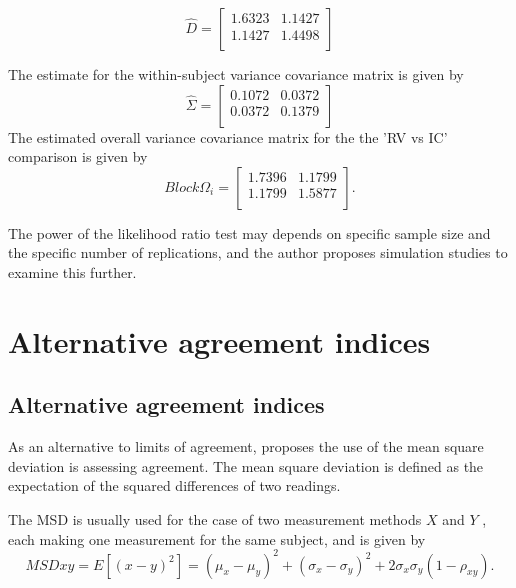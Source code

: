 \documentclass[12pt, a4paper]{report}
\theoremstyle{plain}
\theoremstyle{definition}
\theoremstyle{remark}
\begin{document}
	
	\begin{equation}
	\hat{D}= \left[ \begin{array}{cc}
	1.6323 & 1.1427  \\
	1.1427 & 1.4498 \\
	\end{array} \right]
	\end{equation}
	
	The estimate for the within-subject variance covariance matrix is
	given by
	\begin{equation}
	\hat{\Sigma}= \left[ \begin{array}{cc}
	0.1072 & 0.0372  \\
	0.0372 & 0.1379  \\
	\end{array}\right]
	\end{equation}
	The estimated overall variance covariance matrix for the the 'RV
	vs IC' comparison is given by
	\begin{equation}
	Block \Omega_{i}= \left[ \begin{array}{cc}
	1.7396 & 1.1799  \\
	1.1799 & 1.5877  \\
	\end{array} \right].
	\end{equation}
	
	The power of the likelihood ratio test may depends on specific sample size and the
	specific number of  replications, and the author proposes simulation studies to examine this further.
	
	

	\chapter{Alternative agreement indices}
	
	\section{Alternative agreement indices}
	As an alternative to limits of agreement, \citet{lin2002} proposes the use of the mean square deviation is assessing agreement. The mean square deviation is defined as the expectation of the squared differences	of two readings. 
	
	The MSD is usually used for the case of two
	measurement methods $X$ and $Y$ , each making one measurement for	the same subject, and is given by
	\[
	MSDxy = E[(x - y)^2]  = (\mu_{x} - \mu_{y})^2 + (\sigma_{x} -
	\sigma_{y})^2 + 2\sigma_{x}\sigma_{y}(1-\rho_{xy}).
	\]
	
\end{document}
